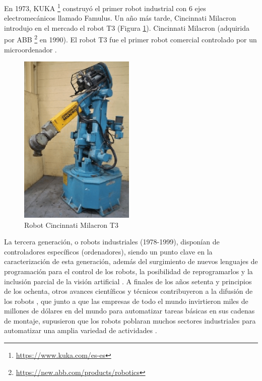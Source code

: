 En 1973, KUKA  \footnote{\url{https://www.kuka.com/es-es}} construyó el primer robot industrial con 6 ejes electromecánicos llamado Famulus. Un año más tarde, Cincinnati Milacron introdujo en el mercado el robot T3 (Figura \ref{fig:T3}). Cincinnati Milacron (adquirida por ABB \footnote{\url{https://new.abb.com/products/robotics}} en 1990). El robot T3 fue el primer robot comercial controlado por un microordenador \cite{Zamalloa17}.\\
  
  \begin{figure} [H]
    \begin{center}
      \includegraphics[width=55mm]{figs/T3_robot.png}
    \end{center}
    \caption{Robot Cincinnati Milacron T3}
    \label{fig:T3}
  \end{figure}
  
La tercera generación, o robots industriales (1978-1999), disponían de controladores específicos (ordenadores), siendo un punto clave en la caracterización de esta generación, además del surgimiento de nuevos lenguajes de programación para el control de los robots, la posibilidad de reprogramarlos y la inclusión parcial de la visión artificial \cite{Zamalloa17}. A finales de los años setenta y principios de los ochenta, otros avances científicos y técnicos contribuyeron a la difusión de los robots \cite{Gasparetto19}, que junto a que las empresas de todo el mundo invirtieron miles de millones de dólares en del mundo para automatizar tareas básicas en sus cadenas de montaje, supusieron que los robots poblaran muchos sectores industriales para automatizar una amplia variedad de actividades \cite{Zamalloa17}.\\ 

